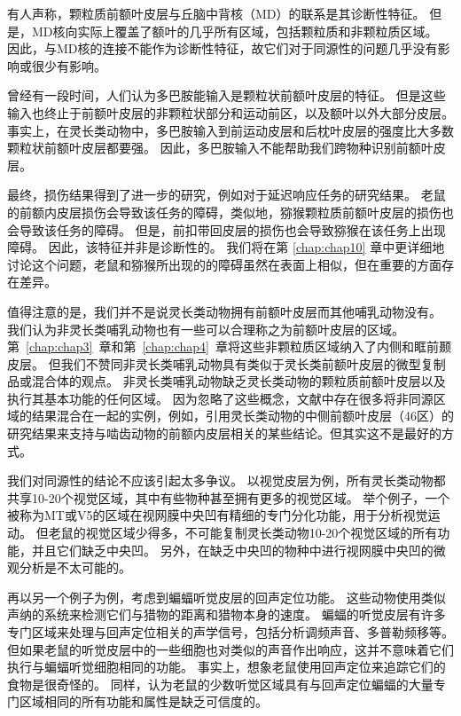 有人声称，颗粒质前额叶皮层与丘脑中背核（MD）的联系是其诊断性特征\cite{je1948orbitofrontal,akert1964comparative,uylings2003rats}。
但是，MD核向实际上覆盖了额叶的几乎所有区域，包括颗粒质和非颗粒质区域。
因此，与MD核的连接不能作为诊断性特征，故它们对于同源性的问题几乎没有影响或很少有影响。


曾经有一段时间，人们认为多巴胺能输入是颗粒状前额叶皮层的特征\cite{divac1978converging,porrino1982brainstem}。
但是这些输入也终止于前额叶皮层的非颗粒状部分和运动前区，以及额叶以外大部分皮层。
事实上，在灵长类动物中，多巴胺输入到前运动皮层和后枕叶皮层的强度比大多数颗粒状前额叶皮层都要强\cite{gaspar1992topography,williams1998widespread}。
因此，多巴胺输入不能帮助我们跨物种识别前额叶皮层。


最终，损伤结果得到了进一步的研究，例如对于延迟响应任务的研究结果。
老鼠的前额内皮层损伤会导致该任务的障碍\cite{kolb1974double}，类似地，猕猴颗粒质前额叶皮层的损伤也会导致该任务的障碍\cite{goldman1971analysis}。
但是，前扣带回皮层的损伤也会导致猕猴在该任务上出现障碍\cite{meunier1997effects}。
因此，该特征并非是诊断性的。
我们将在第 \ref{chap:chap10} 章中更详细地讨论这个问题，老鼠和猕猴所出现的的障碍虽然在表面上相似，但在重要的方面存在差异。


值得注意的是，我们并不是说灵长类动物拥有前额叶皮层而其他哺乳动物没有。
我们认为非灵长类哺乳动物也有一些可以合理称之为前额叶皮层的区域。
第~\ref{chap:chap3}~章和第~\ref{chap:chap4}~章将这些非颗粒质区域纳入了内侧和眶前颞皮层。
但我们不赞同非灵长类哺乳动物具有类似于灵长类前额叶皮层的微型复制品或混合体的观点。
非灵长类哺乳动物缺乏灵长类动物的颗粒质前额叶皮层以及执行其基本功能的任何区域。
因为忽略了这些概念，文献中存在很多将非同源区域的结果混合在一起的实例，例如，引用灵长类动物的中侧前额叶皮层（46区）的研究结果来支持与啮齿动物的前额内皮层相关的某些结论。但其实这不是最好的方式。


我们对同源性的结论不应该引起太多争议。
以视觉皮层为例，所有灵长类动物都共享10-20个视觉区域，其中有些物种甚至拥有更多的视觉区域\cite{kaas2020evolution}。
举个例子，一个被称为MT或V5的区域在视网膜中央凹有精细的专门分化功能，用于分析视觉运动。
但老鼠的视觉区域少得多\cite{rosa1999evolution,lyon200734}，不可能复制灵长类动物10-20个视觉区域的所有功能，并且它们缺乏中央凹。
另外，在缺乏中央凹的物种中进行视网膜中央凹的微观分析是不太可能的。


再以另一个例子为例，考虑到蝙蝠听觉皮层的回声定位功能。
这些动物使用类似声纳的系统来检测它们与猎物的距离和猎物本身的速度。
蝙蝠的听觉皮层有许多专门区域来处理与回声定位相关的声学信号，包括分析调频声音、多普勒频移等\cite{suga1997cortical,fitzpatrick1998distribution}。
但如果老鼠的听觉皮层中的一些细胞也对类似的声音作出响应，这并不意味着它们执行与蝙蝠听觉细胞相同的功能。
事实上，想象老鼠使用回声定位来追踪它们的食物是很奇怪的。
同样，认为老鼠的少数听觉区域具有与回声定位蝙蝠的大量专门区域相同的所有功能和属性是缺乏可信度的。


